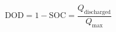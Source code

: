 \documentclass[preview]{standalone}
\begin{document}
\[\text{DOD} = 1 - \text{SOC} = \frac{Q_\text{discharged}}{Q_\text{max}} \tag{3.7}\]
\end{document}
